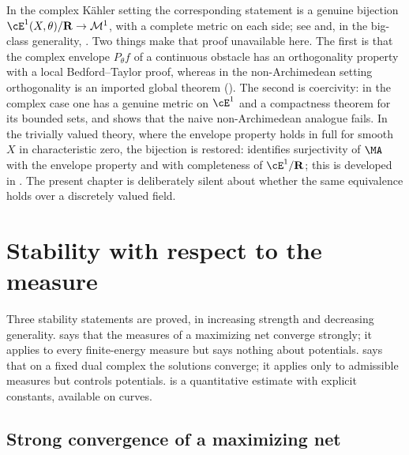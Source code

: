 \begin{remark}
\label{rem:ch28-cy-comparison}
In the complex K\"ahler setting the corresponding statement is a genuine
bijection $\cE^1(X,\theta)/\mathbf R\to\mathcal M^1$, with a complete
metric on each side; see \cite{BBGZ13} and, in the big-class generality,
\cite{BEGZ10,BBEGZ16}.  Two things make that proof unavailable here.  The
first is that the complex envelope $P_\theta f$ of a continuous obstacle
has an orthogonality property with a local Bedford--Taylor proof, whereas in
the non-Archimedean setting orthogonality is an imported global theorem
().  The second is coercivity: in the
complex case one has a genuine metric on $\cE^1$ and a compactness theorem
for its bounded sets, and  shows that
the naive non-Archimedean analogue fails.  In the trivially valued theory,
where the envelope property holds in full for smooth $X$ in characteristic
zero, the bijection is restored: \cite[Theorem~12.8]{BJ22} identifies
surjectivity of $\MA$ with the envelope property and with completeness of
$\cE^1/\mathbf R$; this is developed in
.  The present chapter
is deliberately silent about whether the same equivalence holds over a
discretely valued field.
\end{remark}

\section{Stability with respect to the measure}
\label{sec:ch28-stability}

Three stability statements are proved, in increasing strength and decreasing
generality.   says that the
measures of a maximizing net converge strongly; it applies to every
finite-energy measure but says nothing about potentials.
 says that on a fixed dual complex the
solutions converge; it applies only to admissible measures but controls
potentials.   is a quantitative estimate with
explicit constants, available on curves.

\subsection{Strong convergence of a maximizing net}
\label{sec:ch28-maximizing-net}


